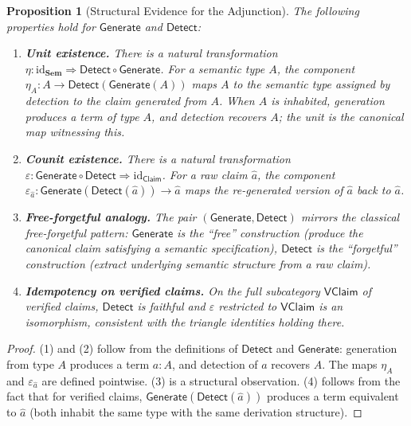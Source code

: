 \documentclass[11pt,a4paper]{article}
\theoremstyle{plain}
\newtheorem{proposition}[theorem]{Proposition}
\theoremstyle{definition}
\theoremstyle{remark}
\newcommand{\Sem}{\mathbf{Sem}}
\newcommand{\id}{\mathrm{id}}
\newcommand{\Detect}{\mathsf{Detect}}
\newcommand{\Generate}{\mathsf{Generate}}
\begin{document}
\begin{proposition}[Structural Evidence for the Adjunction]\label{prop:adjunction-evidence}
The following properties hold for $\Generate$ and $\Detect$:
\begin{enumerate}[nosep]
  \item \textbf{Unit existence.} There is a natural transformation $\eta\colon \id_{\Sem} \Rightarrow \Detect \circ \Generate$. For a semantic type $A$, the component $\eta_A\colon A \to \Detect(\Generate(A))$ maps $A$ to the semantic type assigned by detection to the claim generated from $A$. When $A$ is inhabited, generation produces a term of type $A$, and detection recovers $A$; the unit is the canonical map witnessing this.

  \item \textbf{Counit existence.} There is a natural transformation $\varepsilon\colon \Generate \circ \Detect \Rightarrow \id_{\mathsf{Claim}}$. For a raw claim $\hat{a}$, the component $\varepsilon_{\hat{a}}\colon \Generate(\Detect(\hat{a})) \to \hat{a}$ maps the re-generated version of $\hat{a}$ back to $\hat{a}$.

  \item \textbf{Free-forgetful analogy.} The pair $(\Generate, \Detect)$ mirrors the classical free-forgetful pattern: $\Generate$ is the ``free'' construction (produce the canonical claim satisfying a semantic specification), $\Detect$ is the ``forgetful'' construction (extract underlying semantic structure from a raw claim).

  \item \textbf{Idempotency on verified claims.} On the full subcategory $\mathsf{VClaim}$ of verified claims, $\Detect$ is faithful and $\varepsilon$ restricted to $\mathsf{VClaim}$ is an isomorphism, consistent with the triangle identities holding there.
\end{enumerate}
\end{proposition}

\begin{proof}
(1) and (2) follow from the definitions of $\Detect$ and $\Generate$: generation from type $A$ produces a term $a : A$, and detection of $a$ recovers $A$. The maps $\eta_A$ and $\varepsilon_{\hat{a}}$ are defined pointwise. (3) is a structural observation. (4) follows from the fact that for verified claims, $\Generate(\Detect(\hat{a}))$ produces a term equivalent to $\hat{a}$ (both inhabit the same type with the same derivation structure).
\end{proof}
\end{document}
